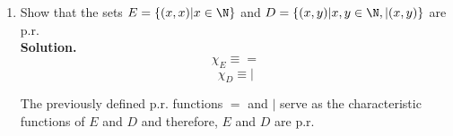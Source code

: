 \begin{enumerate}
	\item Show that the sets $E = \{(x,x) | x \in \N \}$ and $D = \{(x,y) | x,y \in \N, |(x,y) \}$ are p.r.\\
	
	\textbf{Solution.}
	$$
		\chi_E \equiv =
	$$
	$$
		\chi_D \equiv |
	$$
	
	The previously defined p.r. functions $=$ and $|$ serve as the characteristic functions of $E$ and $D$ and therefore, $E$ and $D$ are p.r.
\end{enumerate}

